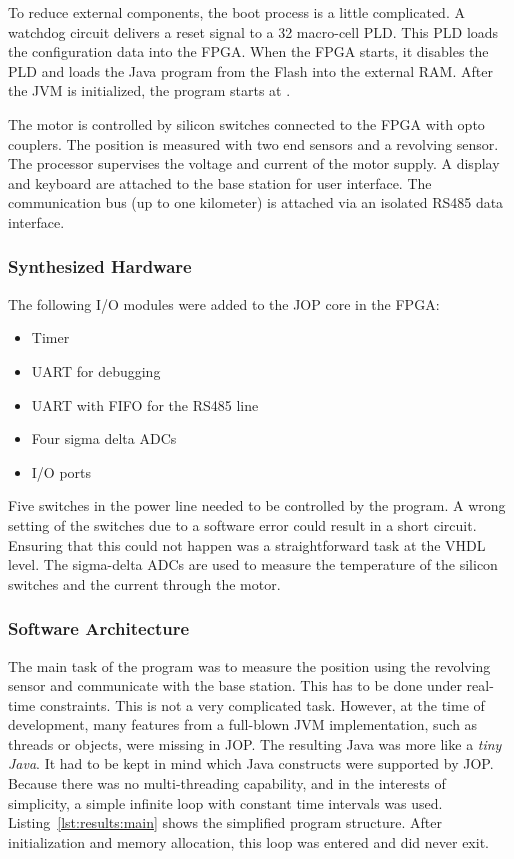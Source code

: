 To reduce external components, the boot process is a little
complicated. A watchdog circuit delivers a reset signal to a 32
macro-cell PLD. This PLD loads the configuration data into the FPGA.
When the FPGA starts, it disables the PLD and loads the Java program
from the Flash into the external RAM. After the JVM is initialized,
the program starts at .

The motor is controlled by silicon switches connected to the FPGA
with opto couplers. The position is measured with two end sensors
and a revolving sensor. The processor supervises the voltage and
current of the motor supply. A display and keyboard are attached to
the base station for user interface. The communication bus (up to
one kilometer) is attached via an isolated RS485 data interface.

\subsubsection{Synthesized Hardware}

The following I/O modules were added to the JOP core in the FPGA:
%
\begin{itemize}
\item Timer
\item UART for debugging
\item UART with FIFO for the RS485 line
\item Four sigma delta ADCs
\item I/O ports
\end{itemize}
%
Five switches in the power line needed to be controlled by the
program. A wrong setting of the switches due to a software error
could result in a short circuit. Ensuring that this could not happen
was a straightforward task at the VHDL level. The sigma-delta ADCs
are used to measure the temperature of the silicon switches and the
current through the motor.

\subsubsection{Software Architecture}

The main task of the program was to measure the position using the
revolving sensor and communicate with the base station. This has to
be done under real-time constraints. This is not a very complicated
task. However, at the time of development, many features from a
full-blown JVM implementation, such as threads or objects, were
missing in JOP. The resulting Java was more like a \emph{tiny Java}.
It had to be kept in mind which Java constructs were supported by
JOP. Because there was no multi-threading capability, and in the
interests of simplicity, a simple infinite loop with constant time
intervals was used. Listing~\ref{lst:results:main} shows the
simplified program structure. After initialization and memory
allocation, this loop was entered and did never exit.

